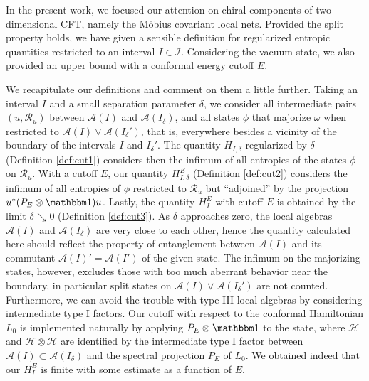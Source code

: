 \documentclass[a4paper,12pt]{article}
\theoremstyle{plain}
\theoremstyle{definition}
\theoremstyle{remark}
\def\A{{\mathcal A}}
\def\H{{\mathcal H}}
\def\R{{\mathcal R}}
\def\R{{\mathcal R}}
\def\1{{\mathbbm 1}}
\begin{document}
In the present work, we focused our attention on chiral components of two-dimensional CFT, namely the M\"obius covariant local nets.
Provided the split property holds, we have given a sensible definition for regularized entropic quantities restricted
to an interval $I\in\mathcal{I}$. Considering the vacuum state, we also provided an upper bound
with a conformal energy cutoff $E$.

We recapitulate our definitions and comment on them a little further. Taking an interval $I$ and a small separation parameter $\delta$,
we consider all intermediate pairs $(u,\R_u)$ between $\A(I)$ and $\A(I_\delta)$, and all states $\phi$ that majorize $\omega$
when restricted to $\A(I)\vee\A(I_\delta')$, that is, everywhere besides a vicinity of the boundary of the intervals $I$ and $I_\delta'$.
The quantity $H_{I,\delta}$ regularized by $\delta$ (Definition \ref{def:cut1}) considers then the infimum of all entropies
of the states $\phi$ on $\R_u$.
With a cutoff $E$, our quantity $H_{I,\delta}^E$ (Definition \ref{def:cut2}) considers the infimum of all entropies of $\phi$
restricted to $\R_u$ but ``adjoined'' by the projection $u^*(P_E\otimes \1)u$.
Lastly, the quantity $H_I^E$ with cutoff $E$ is obtained by the limit $\delta \searrow 0$ (Definition \ref{def:cut3}).
As $\delta$ approaches zero, the local algebras $\A(I)$ and $\A(I_\delta)$ are very close to each other,
hence the quantity calculated here should reflect the property of entanglement between $\A(I)$ and its commutant $\A(I)' = \A(I')$
of the given state.
The infimum on the majorizing states, however, excludes those with too much aberrant behavior near the boundary,
in particular split states on $\A(I) \vee \A(I_\delta')$ are not counted.
Furthermore, we can avoid the trouble with type III local algebras by considering intermediate type I factors.
Our cutoff with respect to the conformal Hamiltonian $L_0$ is implemented naturally by applying
$P_E\otimes \1$ to the state, where $\H$ and $\H\otimes \H$ are identified by the intermediate type I factor
between $\A(I) \subset \A(I_\delta)$ and the spectral projection $P_E$ of $L_0$.
We obtained indeed that our $H_I^E$ is finite with some estimate as a function of $E$.
\end{document}

